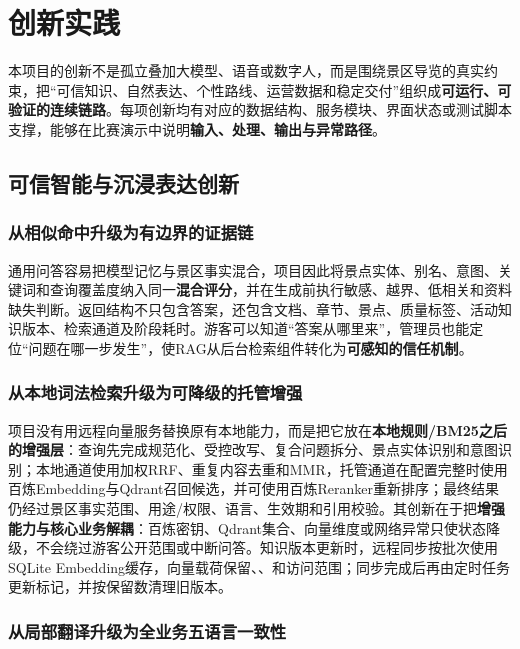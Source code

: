 \chapter{创新实践}

本项目的创新不是孤立叠加大模型、语音或数字人，而是围绕景区导览的真实约束，把“可信知识、自然表达、个性路线、运营数据和稳定交付”组织成\textbf{可运行、可验证的连续链路}。每项创新均有对应的数据结构、服务模块、界面状态或测试脚本支撑，能够在比赛演示中说明\textbf{输入、处理、输出与异常路径}。

\begingroup
{}
\setlength{\parskip}{0.15em}

\section{可信智能与沉浸表达创新}

\subsection{从相似命中升级为有边界的证据链}

通用问答容易把模型记忆与景区事实混合，项目因此将景点实体、别名、意图、关键词和查询覆盖度纳入同一\textbf{混合评分}，并在生成前执行敏感、越界、低相关和资料缺失判断。返回结构不只包含答案，还包含文档、章节、景点、质量标签、活动知识版本、检索通道及阶段耗时。游客可以知道“答案从哪里来”，管理员也能定位“问题在哪一步发生”，使RAG从后台检索组件转化为\textbf{可感知的信任机制}。

\subsection{从本地词法检索升级为可降级的托管增强}

项目没有用远程向量服务替换原有本地能力，而是把它放在\textbf{本地规则/BM25之后的增强层}：查询先完成规范化、受控改写、复合问题拆分、景点实体识别和意图识别；本地通道使用加权RRF、重复内容去重和MMR，托管通道在配置完整时使用百炼Embedding与Qdrant召回候选，并可使用百炼Reranker重新排序；最终结果仍经过景区事实范围、用途/权限、语言、生效期和引用校验。其创新在于把\textbf{增强能力与核心业务解耦}：百炼密钥、Qdrant集合、向量维度或网络异常只使状态降级，不会绕过游客公开范围或中断问答。知识版本更新时，远程同步按批次使用SQLite Embedding缓存，向量载荷保留、、和访问范围；同步完成后再由定时任务更新标记，并按保留数清理旧版本。

\subsection{从局部翻译升级为全业务五语言一致性}

